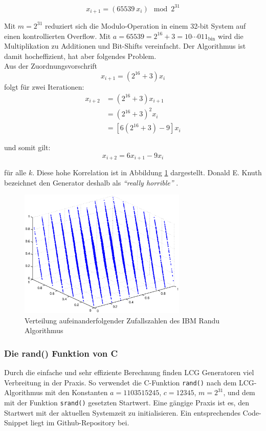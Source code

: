 \documentclass{book}
\begin{document}
\begin{refsection}
\begin{equation}
	x_{i+1} = \left( 65539 \: x_i \right) \mod{2^{31}}
	\label{equ:ibm_randu}
\end{equation}

Mit $m = 2^{31}$ reduziert sich die Modulo-Operation in einem 32-bit System auf einen kontrollierten Overflow. Mit $a = 65539 = 2^{16} + 3 = 10\cdots011_{\text{bin}}$ wird die Multiplikation zu Additionen und Bit-Shifts vereinfacht. Der Algorithmus ist damit hocheffizient, hat aber folgendes Problem. \\

Aus der Zuordnungsvorschrift
\begin{equation*}
	x_{i+1} = (2^{16} + 3) x_i
\end{equation*}
folgt für zwei Iterationen:
\begin{align*}
	x_{i+2} &= (2^{16} + 3) x_{i+1} \\
	 &= (2^{16} + 3)^2 x_i \\
	 &= [6 (2^{16} + 3) - 9] x_i
\end{align*}

und somit gilt:
\begin{equation}
	x_{i+2} = 6 x_{i+1} - 9 x_i
\end{equation}

für alle $k$. Diese hohe Korrelation ist in Abbildung \ref{fig:IBMRandu} dargestellt. Donald E. Knuth bezeichnet den Generator deshalb als \textit{``really horrible''} \cite[p.173]{rng:KnuthVol2}. \\

\begin{figure}[htbp]
	\centering
	\includegraphics[width=8cm]{images/ibm_randu.eps}
	\caption{Verteilung aufeinanderfolgender Zufallszahlen des IBM Randu Algorithmus}
	\label{fig:IBMRandu}
\end{figure}


\subsubsection{Die rand() Funktion von C}
Durch die einfache und sehr effiziente Berechnung finden LCG Generatoren viel Verbreitung in der Praxis. So verwendet die C-Funktion \texttt{rand()} nach dem LCG-Algorithmus mit den Konstanten $a=1103515245$, $c=12345$, $m=2^{31}$, und dem mit der Funktion \texttt{srand()} gesetzten Startwert. \cite{rng:randFunction} Eine gängige Praxis ist es, den Startwert mit der aktuellen Systemzeit zu initialisieren. Ein entsprechendes Code-Snippet liegt im Github-Repository bei. \cite{rng:githubRepo} \\


\end{refsection}
\end{document}
